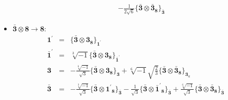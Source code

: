 \documentclass[english]{article}
\newcommand{\subcg}[3]{\big\{ {#1}\otimes{#2}\big\}^{}_{#3}}
\newcommand{\rep}[1]{\mathbf{#1}}
\begin{document}
\begin{itemize}
\begin{eqnarray*}
 & & -\frac{1}{2 \sqrt{6}}\subcg{\rep{\bar{3}}}{\rep{\bar{3}}_{\rep{8}}}{\rep{\bar{3}}}
\end{eqnarray*}
\item $\rep{\bar{3}}\otimes\rep{8}\to\rep{8}$:
\begin{eqnarray*}
\rep{1^{\prime}} &=& \subcg{\rep{\bar{3}}}{\rep{3}_{\rep{8}}}{\rep{1^{\prime}}}
\\
\rep{\bar{1}^{\prime}} &=& \sqrt[3]{-1}\subcg{\rep{\bar{3}}}{\rep{3}_{\rep{8}}}{\rep{\bar{1}^{\prime}}}
\\
\rep{3} &=& -\frac{\sqrt[6]{-1}}{\sqrt{3}}\subcg{\rep{\bar{3}}}{\rep{3}_{\rep{8}}}{\rep{3}}+\sqrt[6]{-1} \sqrt{\frac{2}{3}}\subcg{\rep{\bar{3}}}{\rep{\bar{3}}_{\rep{8}}}{\rep{3}_{a}}
\\
\rep{\bar{3}} &=& -\frac{\sqrt[3]{-1}}{\sqrt{3}}\subcg{\rep{\bar{3}}}{\rep{1^{\prime}}_{\rep{8}}}{\rep{\bar{3}}}-\frac{1}{\sqrt{3}}\subcg{\rep{\bar{3}}}{\rep{\bar{1}^{\prime}}_{\rep{8}}}{\rep{\bar{3}}}+\frac{\sqrt[6]{-1}}{\sqrt{3}}\subcg{\rep{\bar{3}}}{\rep{\bar{3}}_{\rep{8}}}{\rep{\bar{3}}}
\end{eqnarray*}
\end{itemize}
\end{document}
